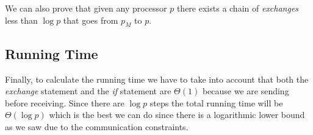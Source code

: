 \documentclass[a4paper]{article}
\begin{document}
        We can also prove that given any processor $p$ there exists a chain of \emph{exchanges} less than $\log p$ that goes from $p_M$ to $p$.
            
    \subsection{Running Time}
        Finally, to calculate the running time we have to take into account that both the \emph{exchange} statement and the \emph{if} statement are $\Theta(1)$ because we are sending before receiving. Since there are $\log p$ steps the total running time will be $\Theta(\log p)$ which is the best we can do since there is a logarithmic lower bound as we saw due to the communication constraints.
\end{document}
